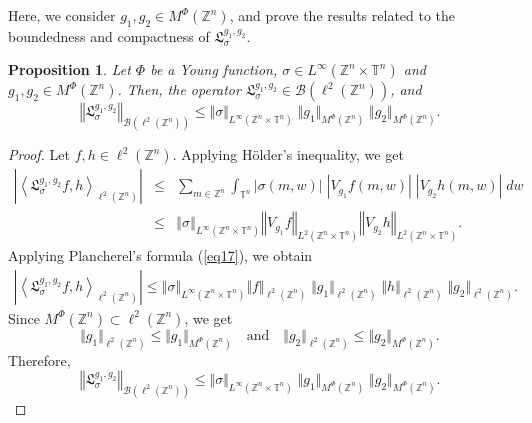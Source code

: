 \documentclass[a4paper,11pt, reqno]{amsart}
\theoremstyle{plain}
\newtheorem{proposition}[theorem]{Proposition}
\theoremstyle{definition}
\theoremstyle{remark}
\def \Z{{\mathbb Z}}
\def \T{{\mathbb T}}
\begin{document}
Here, we consider $g_1, g_2 \in  M^{\Phi}(\Z^n)$, and prove the results related to the boundedness and compactness of $\mathfrak{L}^{g_1, g_2}_{\sigma}$.
\begin{proposition}\label{pro01}
Let $\Phi$ be a Young function, $\sigma \in L^\infty(\Z^n \times \T^n)$ and $g_1, g_2 \in  M^{\Phi}(\Z^n)$. Then, the operator $\mathfrak{L}^{g_1, g_2}_{\sigma} \in \mathcal{B}(\ell^2(\Z^n))$, and
\[ \left\Vert \mathfrak{L}^{g_1, g_2}_{\sigma} \right\Vert_{\mathcal{B}(\ell^2(\Z^n))} \leq \Vert \sigma \Vert_{L^\infty(\Z^n \times \T^n)} \; \Vert g_1 \Vert_{M^{\Phi}(\Z^n)} \; \Vert g_2 \Vert_{M^{\Phi}(\Z^n)}. \]
\end{proposition}
\begin{proof}
Let $f, h \in \ell^2(\Z^n)$. Applying H\"older's inequality, we get
\begin{eqnarray*}
\left| \left\langle \mathfrak{L}^{g_1, g_2}_{\sigma}f, h \right\rangle_{\ell^2(\Z^n)} \right| 
& \leq & \sum_{m \in \Z^n}  \int_{\T^n} |\sigma(m, w)| \; \left|V_{g_1}f(m,w) \right|\; \left|V_{g_2}h(m,w) \right| \; dw \\ 
& \leq & \left\Vert \sigma \right\Vert_{L^\infty(\Z^n \times \T^n)} \left\Vert V_{g_1}f  \right\Vert_{L^2(\Z^n \times \T^n)} \left\Vert V_{g_2}h \right\Vert_{L^2(\Z^n \times \T^n)}.
\end{eqnarray*}
Applying Plancherel's formula (\ref{eq17}), we obtain
\begin{eqnarray*}
\left| \left\langle \mathfrak{L}^{g_1, g_2}_{\sigma}f, h \right\rangle_{\ell^2(\Z^n)} \right| 
\leq  \left\Vert \sigma \right\Vert_{L^\infty(\Z^n \times \T^n)} \Vert f \Vert_{\ell^2(\Z^n)} \; \Vert g_1 \Vert_{\ell^2(\Z^n)} \; \Vert h  \Vert_{\ell^2(\Z^n)} \; \Vert g_2 \Vert_{\ell^2(\Z^n)}.
\end{eqnarray*}
Since $M^{\Phi}(\Z^n) \subset \ell^2(\Z^n)$, we get
\[\Vert g_1 \Vert_{\ell^2(\Z^n)} \leq \Vert g_1 \Vert_{M^{\Phi}(\Z^n)} \quad \text{and} \quad  \Vert g_2  \Vert_{\ell^2(\Z^n)} \leq \Vert g_2 \Vert_{M^{\Phi}(\Z^n)}. \]
Therefore,
\[ \left\Vert \mathfrak{L}^{g_1, g_2}_{\sigma} \right\Vert_{\mathcal{B}(\ell^2(\Z^n))} \leq \Vert \sigma \Vert_{L^\infty(\Z^n \times \T^n)}\; \Vert g_1 \Vert_{M^{\Phi}(\Z^n)} \; \Vert g_2 \Vert_{M^{\Phi}(\Z^n)}. \]
\end{proof}
\end{document}

